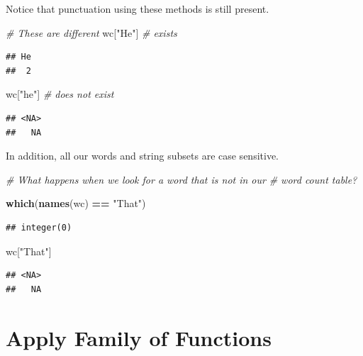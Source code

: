 \documentclass[
]{book}
\newenvironment{Shaded}{\begin{snugshade}}{\end{snugshade}}
\newcommand{\CommentTok}[1]{\textcolor[rgb]{0.56,0.35,0.01}{\textit{#1}}}
\newcommand{\KeywordTok}[1]{\textcolor[rgb]{0.13,0.29,0.53}{\textbf{#1}}}
\newcommand{\NormalTok}[1]{#1}
\newcommand{\OperatorTok}[1]{\textcolor[rgb]{0.81,0.36,0.00}{\textbf{#1}}}
\newcommand{\StringTok}[1]{\textcolor[rgb]{0.31,0.60,0.02}{#1}}
\begin{document}
Notice that punctuation using these methods is still present.

\begin{Shaded}
\begin{Highlighting}[]
\CommentTok{# These are different}
\NormalTok{wc[}\StringTok{"He"}\NormalTok{]  }\CommentTok{# exists}
\end{Highlighting}
\end{Shaded}

\begin{verbatim}
## He 
##  2
\end{verbatim}

\begin{Shaded}
\begin{Highlighting}[]
\NormalTok{wc[}\StringTok{"he"}\NormalTok{]  }\CommentTok{# does not exist}
\end{Highlighting}
\end{Shaded}

\begin{verbatim}
## <NA> 
##   NA
\end{verbatim}

In addition, all our words and string subsets are case sensitive.

\begin{Shaded}
\begin{Highlighting}[]
\CommentTok{# What happens when we look for a word that is not in our}
\CommentTok{# word count table?}

\KeywordTok{which}\NormalTok{(}\KeywordTok{names}\NormalTok{(wc) }\OperatorTok{==}\StringTok{ "That"}\NormalTok{)}
\end{Highlighting}
\end{Shaded}

\begin{verbatim}
## integer(0)
\end{verbatim}

\begin{Shaded}
\begin{Highlighting}[]
\NormalTok{wc[}\StringTok{"That"}\NormalTok{]}
\end{Highlighting}
\end{Shaded}

\begin{verbatim}
## <NA> 
##   NA
\end{verbatim}

\hypertarget{apply}{%
\chapter{Apply Family of Functions}\label{apply}}
\end{document}
